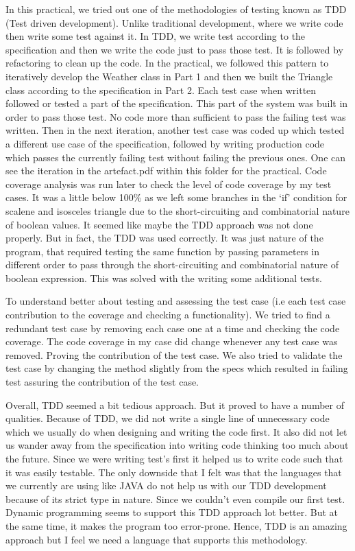 \documentclass[12pt]{article}
\begin{document}
In this practical, we tried out one of the methodologies of testing known as TDD (Test driven development). Unlike traditional development, where we write code then write some test against it. In TDD, we write test according to the specification and then we write the code just to pass those test. It is followed by refactoring to clean up the code. In the practical, we followed this pattern to iteratively develop the Weather class in Part 1 and then we built the Triangle class according to the specification in Part 2. Each test case when written followed or tested a part of the specification. This part of the system was built in order to pass those test. No code more than sufficient to pass the failing test was written. Then in the next iteration, another test case was coded up which tested a different use case of the specification, followed by writing production code which passes the currently failing test without failing the previous ones. One can see the iteration in the artefact.pdf within this folder for the practical. Code coverage analysis was run later to check the level of code coverage by my test cases. It was a little below 100\% as we left some branches in the `if' condition for scalene and isosceles triangle due to the short-circuiting and combinatorial nature of boolean values. It seemed like maybe the TDD approach was not done properly. But in fact, the TDD was used correctly. It was just nature of the program, that required testing the same function by passing parameters in different order to pass through the short-circuiting and combinatorial nature of boolean expression. This was solved with the writing some additional tests.

To understand better about testing and assessing the test case (i.e each test case contribution to the coverage and checking a functionality). We tried to find a redundant test case by removing each case one at a time and checking the code coverage. The code coverage in my case did change whenever any test case was removed. Proving the contribution of the test case. We also tried to validate the test case by changing the method slightly from the specs which resulted in failing test assuring the contribution of the test case.

Overall, TDD seemed a bit tedious approach. But it proved to have a number of qualities. Because of TDD, we did not write a single line of unnecessary code which we usually do when designing and writing the code first. It also did not let us wander away from the specification into writing code thinking too much about the future. Since we were writing test's first it helped us to write code such that it was easily testable. The only downside that I felt was that the languages that we currently are using like JAVA do not help us with our TDD development because of its strict type in nature. Since we couldn't even compile our first test. Dynamic programming seems to support this TDD approach lot better. But at the same time, it makes the program too error-prone. Hence, TDD is an amazing approach but I feel we need a language that supports this methodology.
\end{document}
